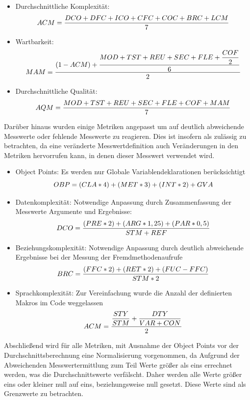 \documentclass[gb,ngerman]{stthesis}
\begin{document}
			\begin{itemize}
				\item Durchschnittliche Komplexität:
				\begin{equation}
					\small{ACM = \dfrac{DCO + DFC + ICO + CFC + COC + BRC + LCM}{7}}
				\end{equation}
				\item Wartbarkeit:
				\begin{equation}
					\small{MAM = \dfrac{(1 - ACM) + \dfrac{MOD + TST + REU + SEC + FLE + \dfrac{COF} {2}}{6}}{2}}
				\end{equation}
				\item Durchschnittliche Qualität:
				\begin{equation}
					\small{AQM = \dfrac{MOD + TST + REU + SEC + FLE + COF + MAM}{7}}
				\end{equation}
			\end{itemize}
			Darüber hinaus wurden einige Metriken angepasst um auf deutlich abweichende Messwerte oder fehlende Messwerte zu reagieren. Dies ist insofern als zulässig zu betrachten, da eine veränderte Messwertdefinition auch Veränderungen in den Metriken hervorrufen kann, in denen dieser Messwert verwendet wird. 
			\begin{itemize}
				\item Object Points: Es werden nur Globale Variablendeklarationen berücksichtigt
				\begin{equation}
					\small{OBP = (CLA * 4) + (MET * 3) + (INT * 2) + GVA}
				\end{equation}
				\item Datenkomplexität: Notwendige Anpassung durch Zusammenfassung der Messwerte Argumente und Ergebnisse:
				\begin{equation}
					\small{DCO = \dfrac{(PRE * 2) + (ARG * 1,25) + (PAR * 0,5)}{STM + REF}}
				\end{equation} 
				\item Beziehungskomplexität: Notwendige Anpassung durch deutlich abweichende Ergebnisse bei der Messung der Fremdmethodenaufrufe 
				\begin{equation}
					\small{BRC = \dfrac{(FFC * 2) + (RET * 2) + (FUC - FFC)}{STM * 2}}
				\end{equation}
				\item Sprachkomplexität: Zur Vereinfachung wurde die Anzahl der definierten Makros im Code weggelassen
				\begin{equation}
					\small{ACM = \dfrac{\dfrac{STY}{STM} + \dfrac{DTY}{VAR + CON}}{2}}
				\end{equation}
			\end{itemize}
			Abschließend wird für alle Metriken, mit Ausnahme der Object Points vor der Durchschnittsberechnung eine Normalisierung vorgenommen, da Aufgrund der Abweichenden Messwertermittlung zum Teil Werte größer als eins errechnet werden, was die Durchschnittswerte verfälscht. Daher werden alle Werte größer eins oder kleiner null auf eins, beziehungsweise null gesetzt. Diese Werte sind als Grenzwerte zu betrachten.
\end{document}
